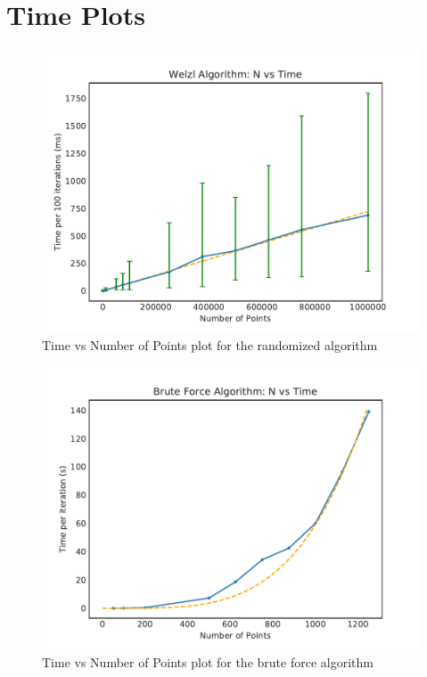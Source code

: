 \documentclass{article}
\begin{document}
\makeheader%

\section*{Time Plots}
\begin{margin}
    
    \begin{figure}[h!]
        \centering
        \includegraphics{plots/plot-welzl.pdf}
        \caption{Time vs Number of Points plot for the randomized algorithm}
        \label{fig:welzl}
    \end{figure}

    \begin{figure}[h!]
        \centering
        \includegraphics{plots/plot-brute.pdf}
        \caption{Time vs Number of Points plot for the brute force algorithm}
        \label{fig:brute}
    \end{figure}

\end{margin}
\end{document}
